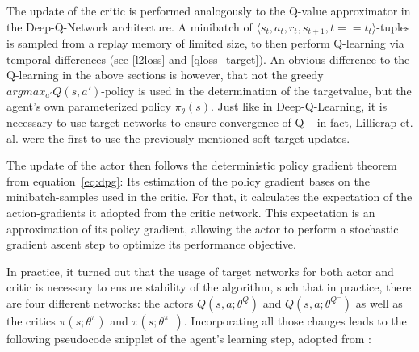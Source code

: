 The update of the critic is performed analogously to the Q-value approximator in the Deep-Q-Network architecture. A minibatch of $\langle s_t, a_t, r_t, s_{t+1}, t==t_t \rangle$-tuples is sampled from a replay memory of limited size, to then perform Q-learning via temporal differences (see \ref{l2loss} and \ref{qloss_target}). An obvious difference to the Q-learning in the above sections is however, that not the greedy $argmax_{a'}Q(s,a')$-policy is used in the determination of the targetvalue, but the agent's own parameterized policy $\pi_\theta(s)$. Just like in Deep-Q-Learning, it is necessary to use target networks to ensure convergence of Q -- in fact, Lillicrap et. al. \cite{lillicrap_continuous_2015} were the first to use the previously mentioned soft target updates.

The update of the actor then follows the deterministic policy gradient theorem from equation~\ref{eq:dpg}: Its estimation of the policy gradient bases on the minibatch-samples used in the critic. For that, it calculates the expectation of the action-gradients it adopted from the critic network. This expectation is an approximation of its policy gradient, allowing the actor to perform a stochastic gradient ascent step to optimize its performance objective.

In practice, it turned out that the usage of target networks for both actor and critic is necessary to ensure stability of the algorithm, such that in practice, there are four different networks: the actors $Q(s,a;\theta^Q)$ and $Q(s,a;\theta^{Q^-})$ as well as the critics $\pi(s;\theta^\pi)$ and $\pi(s;\theta^{\pi^-})$. Incorporating all those changes leads to the following pseudocode snipplet of the agent's learning step, adopted from \cite{lillicrap_continuous_2015}: \\

